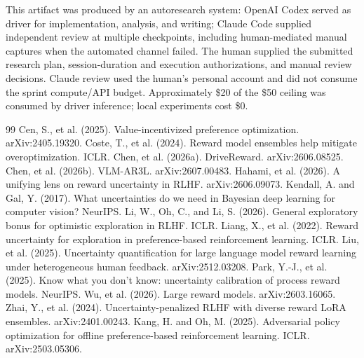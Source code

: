 \documentclass{article}
\begin{document}
\begin{ack}
This artifact was produced by an autoresearch system: OpenAI Codex served as driver for implementation, analysis, and writing; Claude Code supplied independent review at multiple checkpoints, including human-mediated manual captures when the automated channel failed. The human supplied the submitted research plan, session-duration and execution authorizations, and manual review decisions. Claude review used the human's personal account and did not consume the sprint compute/API budget. Approximately \$20 of the \$50 ceiling was consumed by driver inference; local experiments cost \$0.
\end{ack}

\small
\begin{thebibliography}{99}
 Cen, S., et al. (2025). Value-incentivized preference optimization. arXiv:2405.19320.
 Coste, T., et al. (2024). Reward model ensembles help mitigate overoptimization. ICLR.
 Chen, et al. (2026a). DriveReward. arXiv:2606.08525.
 Chen, et al. (2026b). VLM-AR3L. arXiv:2607.00483.
 Hahami, et al. (2026). A unifying lens on reward uncertainty in RLHF. arXiv:2606.09073.
 Kendall, A. and Gal, Y. (2017). What uncertainties do we need in Bayesian deep learning for computer vision? NeurIPS.
 Li, W., Oh, C., and Li, S. (2026). General exploratory bonus for optimistic exploration in RLHF. ICLR.
 Liang, X., et al. (2022). Reward uncertainty for exploration in preference-based reinforcement learning. ICLR.
 Liu, et al. (2025). Uncertainty quantification for large language model reward learning under heterogeneous human feedback. arXiv:2512.03208.
 Park, Y.-J., et al. (2025). Know what you don't know: uncertainty calibration of process reward models. NeurIPS.
 Wu, et al. (2026). Large reward models. arXiv:2603.16065.
 Zhai, Y., et al. (2024). Uncertainty-penalized RLHF with diverse reward LoRA ensembles. arXiv:2401.00243.
 Kang, H. and Oh, M. (2025). Adversarial policy optimization for offline preference-based reinforcement learning. ICLR. arXiv:2503.05306.
\end{thebibliography}
\end{document}
